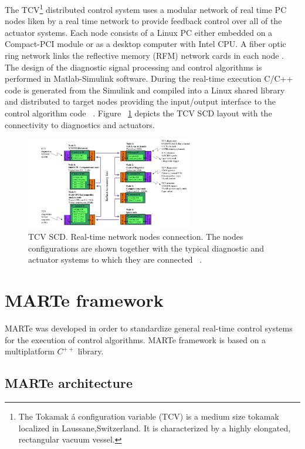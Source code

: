 The TCV\footnote{The Tokamak \'a configuration variable (TCV) is  a medium size tokamak localized in Laussane,Switzerland. It is characterized by a highly elongated, rectangular vacuum vessel.} distributed control system uses a modular network of real time PC nodes liken by a real time network to provide feedback control over all of the actuator systems. Each node consists of a Linux PC either embedded on a Compact-PCI module or as a desktop computer with Intel CPU. A fiber optic ring network links the reflective memory (RFM) network cards in each node  \cite{TCVcntrl}.  The design of the diagnostic signal processing and control algorithms is performed in Matlab-Simulink software.  During the real-time execution  C/C++  code is generated from the Simulink and compiled  into a Linux shared library and distributed to target nodes  providing the input/output interface to the control algorithm code  ~\cite{TCVcntrl1}. Figure ~\ref{TCVcontrol} depicts the TCV SCD layout with the connectivity to diagnostics and actuators.


\begin{figure}[htbp]
	\centering
	\includegraphics[width=0.65\textwidth]{Chp2/TCVcntrl1.png}
	\caption{\label{TCVcontrol} TCV SCD. Real-time network nodes connection. The nodes configurations 	are shown together with the typical diagnostic and actuator systems to which they are connected  ~\cite{TCVcntrl1}.  }
\end{figure}

\section{MARTe framework}

MARTe was developed in order to standardize general real-time control systems for the execution of control algorithms. MARTe framework is based on a multiplatform $C^{++}$ library. \cite{Neto2011} 

\subsection{MARTe architecture }

